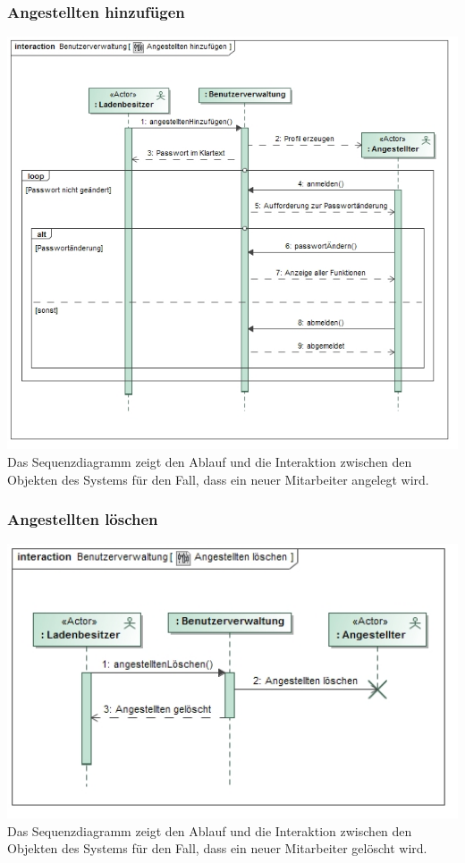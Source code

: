 \documentclass[pdftex,12pt,a4paper]{article}
\begin{document}
\subsubsection*{Angestellten hinzuf\"ugen}
\includegraphics[width=1\textwidth]{../Pflichtenheft/images/angestelltenhinzufuegen}
Das Sequenzdiagramm zeigt den Ablauf und die Interaktion zwischen den Objekten des Systems f\"ur den Fall, dass ein neuer Mitarbeiter angelegt wird.
\subsubsection*{Angestellten l\"oschen}
\includegraphics[width=1\textwidth]{../Pflichtenheft/images/angestelltenloeschen}
Das Sequenzdiagramm zeigt den Ablauf und die Interaktion zwischen den Objekten des Systems f\"ur den Fall, dass ein neuer Mitarbeiter gel\"oscht wird.
\end{document}
